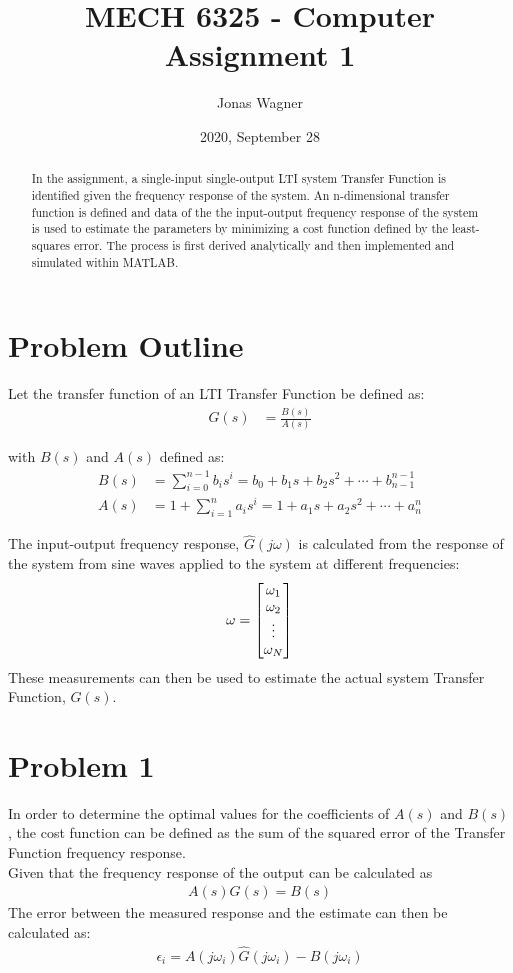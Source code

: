 \documentclass[]{article}
\title{MECH 6325 - Computer Assignment 1}
\author{Jonas Wagner}
\date{2020, September 28}
\begin{document}
\maketitle

\begin{abstract}
	In the assignment, a single-input single-output LTI system Transfer Function is identified given the frequency response of the system. An n-dimensional transfer function is defined and data of the the input-output frequency response of the system is used to estimate the parameters by minimizing a cost function defined by the least-squares error. The process is first derived analytically and then implemented and simulated within MATLAB.
\end{abstract}

\section*{Problem Outline}

	Let the transfer function of an LTI Transfer Function be defined as:
	\begin{align}
		G(s) &= \frac{B(s)}{A(s)}
	\end{align}
	
	with $B(s)$ and $A(s)$ defined as:
	\begin{equation}
			\begin{aligned}
			B(s) &= \sum_{i=0}^{n-1} b_i s^i = b_0 + b_1 s + b_2 s^2 + \cdots + b_{n-1}^{n-1}\\
			A(s) &= 1 + \sum_{i=1}^{n} a_i s^i = 1 + a_1 s + a_2 s^2 + \cdots + a_{n}^{n}
		\end{aligned}
		\label{eq:B(s)_A(s)_def}
	\end{equation}

	
	The input-output frequency response, $\hat{G}(j\omega)$ is calculated from the response of the system from sine waves applied to the system at different frequencies:
	\begin{align*}
		\omega = \mqty[\omega_1 \\ \omega_2 \\ \vdots\\ \omega_N]
	\end{align*}
	These measurements can then be used to estimate the actual system Transfer Function, $G(s)$.

\newpage
\section{Problem 1}
	In order to determine the optimal values for the coefficients of $A(s)$ and $B(s)$, the cost function can be defined as the sum of the squared error of the Transfer Function frequency response.\\
	Given that the frequency response of the output can be calculated as
	\begin{align}
		A(s) G(s) = B(s)
	\end{align}
	The error between the measured response and the estimate can then be calculated as:			
	\begin{align}
		\epsilon_i = A(j\omega_i) \hat{G}(j\omega_i) - B(j\omega_i)
	\end{align}
		
\end{document}
